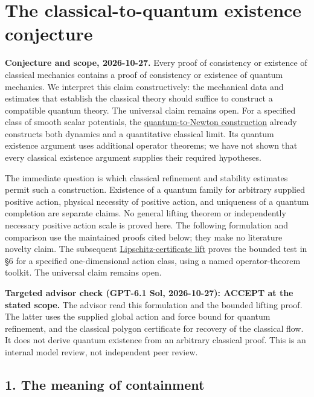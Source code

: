 \documentclass[11pt,a4paper]{article}
\begin{document}
\hypertarget{the-classical-to-quantum-existence-conjecture}{%
\section{The classical-to-quantum existence
conjecture}\label{the-classical-to-quantum-existence-conjecture}}

\textbf{Conjecture and scope, 2026-10-27.} Every proof of consistency or
existence of classical mechanics contains a proof of consistency or
existence of quantum mechanics. We interpret this claim constructively:
the mechanical data and estimates that establish the classical theory
should suffice to construct a compatible quantum theory. The universal
claim remains open. For a specified class of smooth scalar potentials,
the \href{quantum-blocks-construct-newton.md}{quantum-to-Newton
construction} already constructs both dynamics and a quantitative
classical limit. Its quantum existence argument uses additional operator
theorems; we have not shown that every classical existence argument
supplies their required hypotheses.

The immediate question is which classical refinement and stability
estimates permit such a construction. Existence of a quantum family for
arbitrary supplied positive action, physical necessity of positive
action, and uniqueness of a quantum completion are separate claims. No
general lifting theorem or independently necessary positive action scale
is proved here. The following formulation and comparison use the
maintained proofs cited below; they make no literature novelty claim.
The subsequent
\href{lipschitz-certificate-quantum-lift.md}{Lipschitz-certificate lift}
proves the bounded test in §6 for a specified one-dimensional action
class, using a named operator-theorem toolkit. The universal claim
remains open.

\textbf{Targeted advisor check (GPT-6.1 Sol, 2026-10-27): ACCEPT at the
stated scope.} The advisor read this formulation and the bounded lifting
proof. The latter uses the supplied global action and force bound for
quantum refinement, and the classical polygon certificate for recovery
of the classical flow. It does not derive quantum existence from an
arbitrary classical proof. This is an internal model review, not
independent peer review.

\hypertarget{the-meaning-of-containment}{%
\subsection{1. The meaning of
containment}\label{the-meaning-of-containment}}
\end{document}
